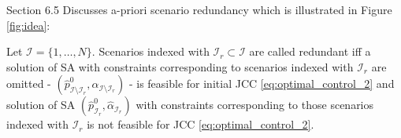 Section 6.5 Discusses a-priori scenario redundancy which is illustrated in Figure \ref{fig:idea}:

\begin{definition}
\label{def:redundant}
Let $\mathcal{I} = \{1, \dots, N\}$. Scenarios indexed with $\mathcal{I}_r \subset \mathcal{I}$ are called redundant iff a solution of SA with constraints corresponding to scenarios indexed with $\mathcal{I}_r$ are omitted - $(\hat{p}^0_{\mathcal{I} \setminus \mathcal{I}_r}, \hat{\alpha}_{\mathcal{I} \setminus \mathcal{I}_r})$ - is feasible for initial JCC \eqref{eq:optimal_control_2} and solution of SA $(\hat{p}^0_{\mathcal{I}_r}, \hat{\alpha}_{\mathcal{I}_r})$ with constraints corresponding to those scenarios indexed with $\mathcal{I}_r$ is not feasible for JCC \eqref{eq:optimal_control_2}.
\end{definition}

